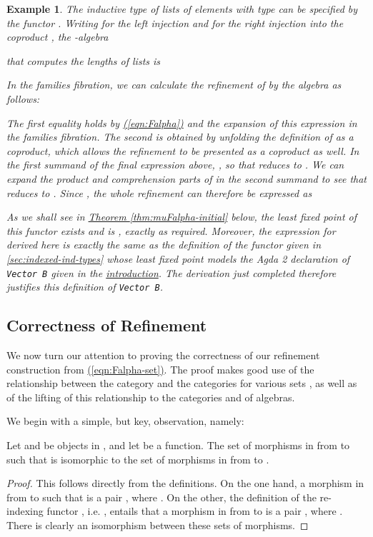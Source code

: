 \documentclass{LMCS}
\newtheorem{eorollary}{Example}
\newcommand{\parenref}[1]{\hyperref[#1]{(\ref*{#1})}}
\newcommand{\thmref}[1]{\hyperref[#1]{Theorem \ref*{#1}}}
\begin{document}
\begin{eorollary}\label{ex:lists-n-vectors}
  The inductive type of lists of elements with type  can be
  specified by the functor . Writing  for the left injection and
   for the right injection into the coproduct
  , the -algebra
  
  that computes the lengths of lists is

In the families fibration, we can calculate the refinement of  by the algebra  as follows:

The first equality holds by \parenref{eqn:Falpha} and the expansion of
this expression in the families fibration. The second is obtained by
unfolding the definition of  as a coproduct, which
allows the refinement to be presented as a coproduct as well. In the
first summand of the final expression above,
, so that  reduces to . We can expand the product and comprehension parts of  in the
second summand to see that  reduces to . Since ,
the whole refinement can therefore be expressed as

As we shall see in \thmref{thm:muFalpha-initial} below, the least
fixed point  of this
functor exists and is ,
exactly as required. Moreover, the expression for
 derived here is exactly the
same as the definition of the functor  given in
\autoref{sec:indexed-ind-types} whose least fixed point models the
Agda 2 declaration of \texttt{Vector B} given in the
\hyperref[sec:introduction]{introduction}.  The derivation just
completed therefore justifies this definition of \verb|Vector B|.
\end{eorollary}

\subsection{Correctness of Refinement}

We now turn our attention to proving the correctness of our refinement
construction from \parenref{eqn:Falpha-set}. The proof makes good use
of the relationship between the category  and the
categories  for various sets , as well as of the
lifting of this relationship to the categories  and
 of algebras.

We begin with a simple, but key, observation, namely:

\begin{lem}\label{lem:hidden-cartesian}
  Let  and  be objects in , and let  be a function. The set of morphisms  in  from
   to  such that  is isomorphic to the set of
  morphisms in  from  to .
\end{lem}
\begin{proof}
  This follows directly from the definitions. On the one hand, a
  morphism  in  from  to  such that  is a pair , where . On the other, the definition of the re-indexing functor
  , i.e.  , entails that a morphism in
   from  to  is a pair , where . There is clearly
  an isomorphism between these sets of morphisms.
\end{proof}
\end{document}
